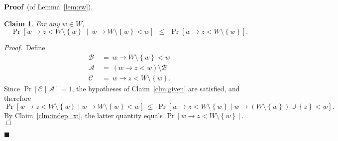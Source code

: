 \documentclass[11pt]{article}
\newcommand{\proofbelow}{8pt}
\numberwithin{equation}{section}
\newtheorem{claim}[theorem]{Claim}
\newenvironment{proofof}[1]{\noindent\textbf{Proof} \,(of #1).\,}{\afterproof}
\newenvironment{subproof}{\noindent\textit{Proof.}\,}{\aftersubproof}
\newcommand{\afterproof}{\hfill $\blacksquare$ \par \vspace{\proofbelow}}
\newcommand{\aftersubproof}{\hfill $\Box$ \par \vspace{\proofbelow}}
\newcommand{\cA}{\mathcal{A}}
\newcommand{\cB}{\mathcal{B}}
\newcommand{\cC}{\mathcal{C}}
\newcommand{\union}{\cup}
\newcommand{\set}[1]{\left \{ #1 \right \}}                     \newcommand{\setst}[2]{\left\{\; #1 \,:\, #2 \;\right\}}
\newcommand{\ClaimName}[1]{\label{clm:#1}}
\newcommand{\Claim}[1]{Claim~\ref{clm:#1}}
\newcommand{\Lemma}[1]{Lemma~\ref{lem:#1}}
\begin{document}
\begin{proofof}{\Lemma{rw}}
\begin{claim}
\ClaimName{mess}
For any $w \in W$,
$$
    \Pr[ w \rightarrow z < W \setminus \set{w} ~\mid~ w \rightarrow W \setminus \set{w} < w ]
    ~~\leq~~
    \Pr[ w \rightarrow z < W \setminus \set{w} ].
$$
\end{claim}
\begin{subproof}
Define
\begin{align*}
\cB &~=~ w \rightarrow W \setminus \set{w} < w \\
\cA &~=~ (w \rightarrow z < w) \setminus \cB \\
\cC &~=~ w \rightarrow z < W \setminus \set{w}.
\end{align*}
Since $\Pr[ \cC \mid \cA ] = 1$, the hypotheses of Claim~\ref{clm:given} are satisfied,
and therefore 
$$
\Pr[ w \rightarrow z < W \setminus \set{w} \mid w \rightarrow W \setminus \set{w} < w ]
~\leq~ 
\Pr[ w \rightarrow z < W \setminus \set{w} \mid w \rightarrow (W \setminus \set{w}) \union \set{z} < w ].
$$
By \Claim{indep_xi}, the latter quantity equals
$ \Pr[ w \rightarrow z < W \setminus \set{w} ]$.
\end{subproof}


\vspace{12pt}


\end{proofof}
\end{document}
